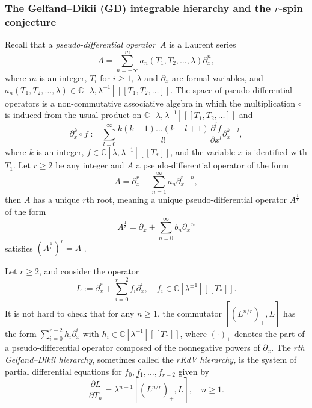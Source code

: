 \documentclass[11pt]{amsart}
\theoremstyle{definition}
\theoremstyle{remark}
\renewcommand{\d}{\ensuremath{\partial}}
\newcommand{\<}{\left<}
\renewcommand{\>}{\right>}
\numberwithin{equation}{section}
\def\C{{\mathbb C}}
\begin{document}
\subsubsection{The Gelfand--Dikii (GD) integrable hierarchy and the $r$-spin conjecture}\label{subsub:rGD_closed}

Recall that a {\it pseudo-differential operator}~$A$ is a Laurent series
\[
A=\sum_{n=-\infty}^m a_n(T_1,T_2,\ldots,\lambda)\partial_x^n,
\]
where $m$ is an integer,  $T_i$ for $i\geq 1,~\lambda$ and $\partial_x$ are formal variables, and $a_n(T_1,T_2,\ldots,\lambda)\in\C[\lambda,\lambda^{-1}][[T_1,T_2,\ldots]]$.     The space of pseudo differential operators is a non-commutative %
associative algebra in %
which the multiplication $\circ$ is induced from the usual product on $\C[\lambda,\lambda^{-1}][[T_1,T_2,\ldots]]$ and 
\[
\d_x^k\circ f:=\sum_{l=0}^\infty\frac{k(k-1)\ldots(k-l+1)}{l!}\frac{\d^lf}{\d x^l}\d_x^{k-l},
\]
where $k$ is an integer, $f\in\mathbb C[\lambda,\lambda^{-1}][[T_*]]$, and the variable $x$ is identified with $T_1$. Let $r\geq 2$ be %
any integer and %
$A$ a pseudo-differential operator of the form
\[
A=\partial_x^r+\sum_{n=1}^\infty a_n\partial_x^{r-n},
\]
then $A$ has a unique $r$th root, meaning a unique pseudo-differential operator $A^{\frac{1}{r}}$ of the %
form
\[
A^{\frac{1}{r}}=\partial_x+\sum_{n=0}^\infty b_n\partial_x^{-n}
\]
satisfies $\left(A^{\frac{1}{r}}\right)^r=A$%
.

Let $r\geq 2$, and consider the operator
$$
L:=\partial_x^r+\sum_{i=0}^{r-2}f_i\partial_x^i,\quad f_i\in\C[\lambda^{\pm1}][[T_*]].
$$
It is not hard to check that for any $n\geq 1$, the commutator $[(L^{n/r})_+,L]$ has the form $\sum_{i=0}^{r-2}h_i\partial_x^i$ with $h_i\in\C[\lambda^{\pm1}][[T_*]]$, where $(\cdot)_+$ denotes the part of a pseudo-differential operator composed of %
the nonnegative powers %
of $\partial_x$. The {\it $r$th Gelfand--Dikii hierarchy}, sometimes called %
the \emph{$r$KdV hierarchy,} is %
the system of partial differential equations for $f_0,f_1,\ldots,f_{r-2}$ %
given by
\begin{equation}
    \label{eq:GD_hier}
\frac{\partial L}{\partial T_n}=\lambda^{n-1}[(L^{n/r})_+,L],\quad n\geq 1.
\end{equation}
\end{document}
